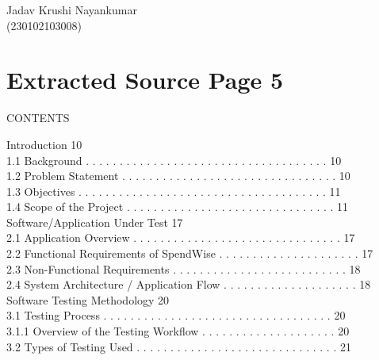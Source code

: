 \documentclass[12pt,a4paper]{report}
\begin{document}
\smallskip

\smallskip

\smallskip

\smallskip
Jadav Krushi Nayankumar\\ 
(230102103008)\\ 

\clearpage
\section*{Extracted Source Page 5}
CONTENTS\\ 

\smallskip

 Introduction                                                                               10\\ 
1.1 Background . . . . . . . . . . . . . . . . . . . . . . . . . . . . . . . . . . . .     10\\ 
1.2 Problem Statement . . . . . . . . . . . . . . . . . . . . . . . . . . . . . . . .      10\\ 
1.3 Objectives . . . . . . . . . . . . . . . . . . . . . . . . . . . . . . . . . . . . .   11\\ 
1.4 Scope of the Project . . . . . . . . . . . . . . . . . . . . . . . . . . . . . . .     11\\ 

 Software/Application Under Test                                                            17\\ 
2.1 Application Overview . . . . . . . . . . . . . . . . . . . . . . . . . . . . . . .     17\\ 
2.2 Functional Requirements of SpendWise . . . . . . . . . . . . . . . . . . . . .         17\\ 
2.3 Non-Functional Requirements . . . . . . . . . . . . . . . . . . . . . . . . . .        18\\ 
2.4 System Architecture / Application Flow . . . . . . . . . . . . . . . . . . . .         18\\ 

 Software Testing Methodology                                                               20\\ 
3.1 Testing Process . . . . . . . . . . . . . . . . . . . . . . . . . . . . . . . . . .    20\\ 
3.1.1 Overview of the Testing Workflow . . . . . . . . . . . . . . . . . . . .         20\\ 
3.2 Types of Testing Used . . . . . . . . . . . . . . . . . . . . . . . . . . . . . .      21\\ 
\end{document}
